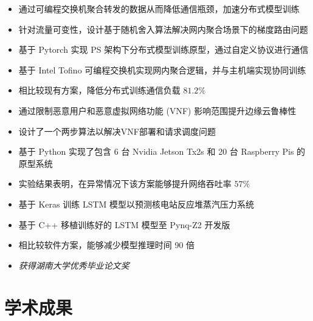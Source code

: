 \documentclass{resume}
\begin{document}
\begin{itemize}[parsep=0.5ex]
  \item 通过可编程交换机聚合转发的数据从而降低通信瓶颈，加速分布式模型训练
  \item 针对流量可变性，设计基于随机舍入算法解决网内聚合场景下的梯度路由问题
  \item 基于 Pytorch 实现 PS 架构下分布式模型训练原型，通过自定义协议进行通信
  \item 基于 Intel Tofino 可编程交换机实现网内聚合逻辑，并与主机端实现协同训练
  \item 相比较现有方案，降低分布式训练通信负载 $81.2\%$
\end{itemize}

\begin{itemize}[parsep=0.5ex]
  \item 通过限制恶意用户和恶意虚拟网络功能 (VNF) 影响范围提升边缘云鲁棒性
  \item 设计了一个两步算法以解决VNF部署和请求调度问题
  \item 基于 Python 实现了包含 6 台 Nvidia Jetson Tx2s 和 20 台 Raspberry Pis 的原型系统
  \item 实验结果表明，在异常情况下该方案能够提升网络吞吐率 $57\%$
\end{itemize}

\begin{itemize}[parsep=0.5ex]
  \item 基于 Keras 训练 LSTM 模型以预测核电站反应堆蒸汽压力系统
  \item 基于 C++ 移植训练好的 LSTM 模型至 Pynq-Z2 开发版
  \item 相比较软件方案，能够减少模型推理时间 90 倍
  \item \textit{获得湖南大学优秀毕业论文奖}
\end{itemize}

\section{学术成果}
\end{document}
